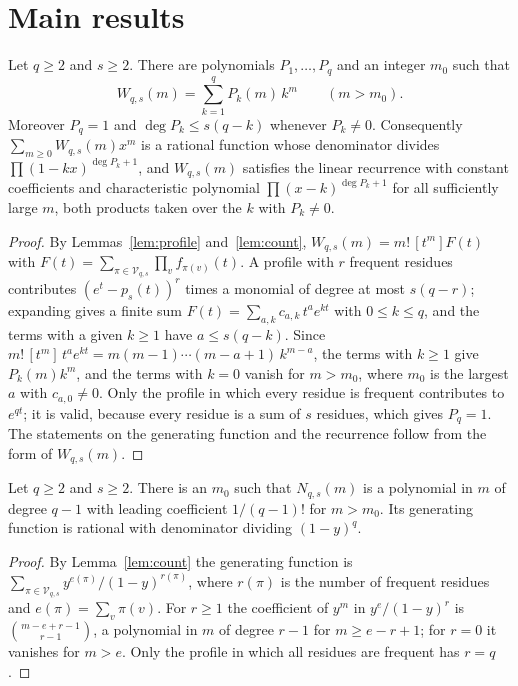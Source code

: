 \documentclass[12pt,reqno]{article}
\begin{document}
\section{Main results}\label{sec:main}

\begin{theorem}\label{thm:words}
Let $q \ge 2$ and $s \ge 2$. There are polynomials $P_1, \ldots, P_q$ and an
integer $m_0$ such that
\[
W_{q,s}(m) = \sum_{k=1}^{q} P_k(m)\, k^m \qquad (m > m_0).
\]
Moreover $P_q = 1$ and $\deg P_k \le s(q-k)$ whenever $P_k \ne 0$.
Consequently $\sum_{m \ge 0} W_{q,s}(m) x^m$ is a rational function whose
denominator divides $\prod (1 - kx)^{\deg P_k + 1}$, and $W_{q,s}(m)$ satisfies
the linear recurrence with constant coefficients and characteristic polynomial
$\prod (x - k)^{\deg P_k + 1}$ for all sufficiently large $m$, both products
taken over the $k$ with $P_k \ne 0$.
\end{theorem}

\begin{proof}
By Lemmas~\ref{lem:profile} and~\ref{lem:count},
$W_{q,s}(m) = m!\,[t^m] F(t)$ with
$F(t) = \sum_{\pi \in \mathcal{V}_{q,s}} \prod_v f_{\pi(v)}(t)$. A profile
with $r$ frequent residues contributes $(e^t - p_s(t))^r$ times a monomial
of degree at most $s(q-r)$; expanding gives a finite sum
$F(t) = \sum_{a, k} c_{a,k}\, t^a e^{kt}$ with $0 \le k \le q$, and the terms
with a given $k \ge 1$ have $a \le s(q-k)$. Since
$m!\,[t^m]\, t^a e^{kt} = m(m-1)\cdots(m-a+1)\, k^{m-a}$, the terms with
$k \ge 1$ give $P_k(m) k^m$, and the terms with $k = 0$ vanish for $m > m_0$,
where $m_0$ is the largest $a$ with $c_{a,0} \ne 0$. Only the profile in which
every residue is frequent contributes to $e^{qt}$; it is valid, because every
residue is a sum of $s$ residues, which gives $P_q = 1$. The statements on
the generating function and the recurrence follow from the form of
$W_{q,s}(m)$.
\end{proof}

\begin{theorem}\label{thm:multisets}
Let $q \ge 2$ and $s \ge 2$. There is an $m_0$ such that $N_{q,s}(m)$ is a
polynomial in $m$ of degree $q-1$ with leading coefficient $1/(q-1)!$ for
$m > m_0$. Its generating function is rational with denominator dividing
$(1-y)^q$.
\end{theorem}

\begin{proof}
By Lemma~\ref{lem:count} the generating function is
$\sum_{\pi \in \mathcal{V}_{q,s}} y^{e(\pi)}/(1-y)^{r(\pi)}$, where $r(\pi)$ is
the number of frequent residues and $e(\pi) = \sum_v \pi(v)$. For $r \ge 1$
the coefficient of $y^m$ in $y^e/(1-y)^r$ is $\binom{m-e+r-1}{r-1}$, a
polynomial in $m$ of degree $r-1$ for $m \ge e-r+1$; for $r = 0$ it vanishes
for $m > e$. Only the profile in which all residues are frequent has
$r = q$.
\end{proof}
\end{document}
